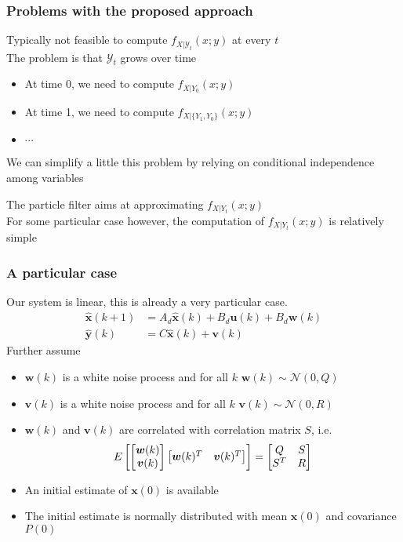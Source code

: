 \begin{frame}
	\frametitle{Problems with the proposed approach}
	Typically not feasible to compute $f_{X|\mathcal{Y}_t}(x;y)$ at every $t$ \\\vspace{1em}
	The problem is that $\mathcal{Y}_t$ grows over time
	\begin{itemize}
		\item At time 0, we need to compute $f_{X|Y_0}(x;y)$
		\item At time 1, we need to compute $f_{X|\{Y_1, Y_0\}}(x;y)$
		\item $\cdots$
	\end{itemize}
	\vspace{0.5em}
	We can simplify a little this problem by relying on conditional independence among variables
	
	\vspace{0.5em}
	The particle filter aims at approximating $f_{X|Y_t}(x;y)$\\
	
	\vspace{0.5em}
	For some particular case however, the computation of $f_{X|Y_t}(x;y)$ is relatively simple
	
\end{frame}
\begin{frame}
	\frametitle{A particular case}
	Our system is linear, this is already a very particular case. 
	\begin{align*}
	\hat{\bm{x}}(k+1) &= A_d \hat{\bm{x}}(k) + B_d \bm{u}(k) + B_d \bm{w}(k)\\
	\hat{\bm{y}}(k) &= C\hat{\bm{x}}(k) + \bm{v}(k)
	\end{align*}
	Further assume
	\begin{itemize}
		\item $\bm{w}(k)$ is a white noise process and for all $k$ $\bm{w}(k)\sim\mathcal{N}(0, Q)$
		\item $\bm{v}(k)$ is a white noise process and for all $k$ $\bm{v}(k)\sim\mathcal{N}(0, R)$
		\item $\bm{w}(k)$ and $\bm{v}(k)$ are correlated with correlation matrix $S$, i.e. 
		$$E\left[\begin{bmatrix}\bm{w}(k)\\\bm{v}(k)\end{bmatrix}\begin{bmatrix}\bm{w}(k)^T&\bm{v}(k)^T\end{bmatrix}\right]=\begin{bmatrix}Q&S\\S^T&R\end{bmatrix}$$
		\item An initial estimate of $\bm{x}(0)$ is available
		\item The initial estimate is normally distributed with mean $\bm{x}(0)$ and covariance $P(0)$
	\end{itemize}
\end{frame}

